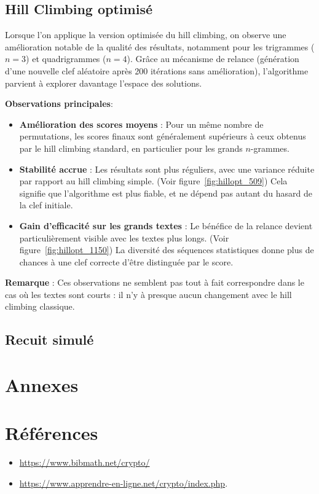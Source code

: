 \documentclass[a4paper]{article}
\begin{document}
\subsection{Hill Climbing optimisé}

Lorsque l’on applique la version optimisée du hill climbing, on observe une amélioration notable de la qualité des résultats, notamment pour les trigrammes ($n=3$) et quadrigrammes ($n=4$). Grâce au mécanisme de relance (génération d’une nouvelle clef aléatoire après 200 itérations sans amélioration), l’algorithme parvient à explorer davantage l’espace des solutions.

\textbf{Observations principales}:
\begin{itemize}
    \item \textbf{Amélioration des scores moyens} : Pour un même nombre de permutations, les scores finaux sont généralement supérieurs à ceux obtenus par le hill climbing standard, en particulier pour les grands $n$-grammes.
    
    \item \textbf{Stabilité accrue} : Les résultats sont plus réguliers, avec une variance réduite par rapport au hill climbing simple. (Voir figure~\ref{fig:hillopt_509}) Cela signifie que l’algorithme est plus fiable, et ne dépend pas autant du hasard de la clef initiale.
    
    \item \textbf{Gain d’efficacité sur les grands textes} : Le bénéfice de la relance devient particulièrement visible avec les textes plus longs. (Voir figure~\ref{fig:hillopt_1150}) La diversité des séquences statistiques donne plus de chances à une clef correcte d’être distinguée par le score.
\end{itemize}

\textbf{Remarque} : Ces observations ne semblent pas tout à fait correspondre dans le cas où les textes sont courts : il n'y à presque aucun changement avec le hill climbing classique.

\subsection{Recuit simulé}

\clearpage
\appendix
\section*{Annexes}
\label{sec:annexes}
\section*{Références}
\label{sec:bibliographie}

\begin{itemize}
    \item \url{https://www.bibmath.net/crypto/}
    \item \url{https://www.apprendre-en-ligne.net/crypto/index.php}.

\end{itemize}
\end{document}
